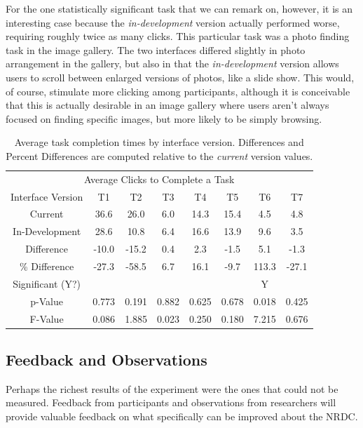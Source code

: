 \documentclass{acm_proc_article-sp}
\begin{document}
For the one statistically significant task that we can remark on, however, it is an interesting case because the \emph{in-development} version actually performed worse, requiring roughly twice as many clicks. This particular task was a photo finding task in the image gallery. The two interfaces differed slightly in photo arrangement in the gallery, but also in that the \emph{in-development} version allows users to scroll between enlarged versions of photos, like a slide show. This would, of course, stimulate more clicking among participants, although it is conceivable that this is actually desirable in an image gallery where users aren't always focused on finding specific images, but more likely to be simply browsing.

\begin{table}
    \centering
    \begin{tabular}{| c | c | c | c | c | c | c | c |}
    \hline
    \multicolumn{8}{|c|}{Average Clicks to Complete a Task} \\
    Interface Version & T1 & T2 & T3 & T4 & T5 & T6 & T7 \\
    \hline
    \hline
    Current           & 36.6 & 26.0 &  6.0 & 14.3 & 15.4 &  4.5 &  4.8 \\
    \hline
    In-Development    & 28.6 & 10.8 &  6.4 & 16.6 & 13.9 &  9.6 &  3.5 \\
    \hline
    \hline
    Difference        & -10.0 & -15.2 & 0.4 & 2.3 & -1.5 &  5.1 &  -1.3 \\
    \hline
    \% Difference     & -27.3 & -58.5 & 6.7 & 16.1 & -9.7 & 113.3 & -27.1 \\
    \hline
    \hline
    Significant (Y?) &       &       &       &       &       &     Y &       \\
    \hline
    p-Value          & 0.773 & 0.191 & 0.882 & 0.625 & 0.678 & 0.018 & 0.425 \\
    \hline
    F-Value          & 0.086 & 1.885 & 0.023 & 0.250 & 0.180 & 7.215 & 0.676 \\
    \hline
    \end{tabular}
    
    \caption{Average task completion times by interface version. Differences and Percent Differences are computed relative to the \emph{current} version values.}
    \label{tab:avg_clicks}
\end{table}

%
\subsection{Feedback and Observations}
Perhaps the richest results of the experiment were the ones that could not be measured. Feedback from participants and observations from researchers will provide valuable feedback on what specifically can be improved about the NRDC.
\end{document}
